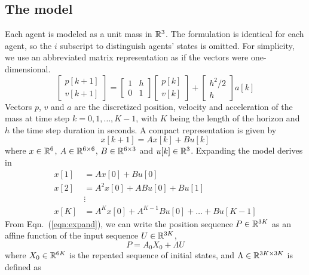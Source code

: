 \subsection{The model}
Each agent is modeled as a unit mass in ${\mathbb R}^3$. The formulation is identical for each agent, so the $i$ subscript to distinguish agents' states is omitted. For simplicity, we use an abbreviated matrix representation as if the vectors were one-dimensional. 
\begin{equation}
\label{eqn: model}
\begin{bmatrix}
p[k+1]\\
v[k+1]
\end{bmatrix} = \begin{bmatrix}
1 & h\\
0 & 1
\end{bmatrix} \begin{bmatrix}
p[k] \\
v[k]
\end{bmatrix} + \begin{bmatrix}
h^2/2 \\
h
\end{bmatrix}a[k]
\end{equation}
Vectors $p$, $v$ and $a$ are the discretized position, velocity and acceleration of the mass at time step $k = {0,1,\ldots,K-1}$, with $K$ being the length of the horizon and $h$ the time step duration in seconds. A compact representation is given by
\begin{equation}
x[k+1] = Ax[k] + Bu[k] 
\end{equation}
where $x \in {\mathbb R}^{6}$, $A \in {\mathbb R}^{6\times 6} $, $B \in {\mathbb R}^{6\times 3}$ and $u[k] \in {\mathbb R}^{3}$. Expanding the model derives in
\begin{equation}
\label{eqn:expand}
\begin{aligned}
x[1] &= Ax[0] + Bu[0]\\
x[2] &= A^2x[0] + ABu[0] + Bu[1]\\
&\vdots\\
x[K] &= A^{K}x[0] + A^{K-1}Bu[0] + \ldots + Bu[K-1]
\end{aligned}
\end{equation}
From Eqn.~(\ref{eqn:expand}), we can write the position sequence $P \in {\mathbb R}^{3K}$ as an affine function of the input sequence $U \in {\mathbb R}^{3K}$,
\begin{equation}
\label{eqn:model}
P = A_0X_0 + \Lambda U
\end{equation}
where $X_0 \in {\mathbb R}^{6K}$ is the repeated sequence of initial states, and $\Lambda \in {\mathbb R}^{3K \times 3K}$ is defined as
